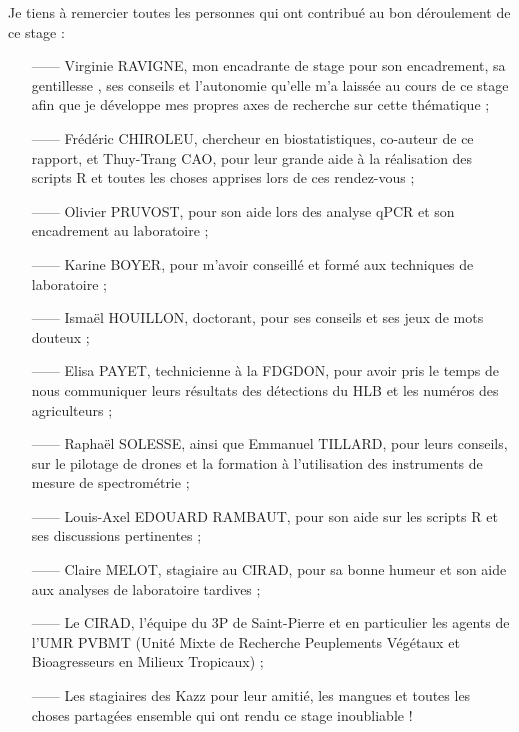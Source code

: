 \documentclass[
  11pt,
  french,
  a4paper,
  extrafontsizes,onecolumn,openright
  ]{memoir}
\begin{document}
\begin{small}

Je tiens à remercier toutes les personnes qui ont contribué au bon déroulement de ce stage : 
\begin{itemize}
\item[——] Virginie RAVIGNE, mon encadrante de stage pour son encadrement, sa gentillesse , ses conseils et l'autonomie qu'elle m'a laissée au cours de ce stage afin que je développe mes propres axes de recherche sur cette thématique ;

\item[——] Frédéric CHIROLEU, chercheur en biostatistiques, co-auteur de ce rapport, et Thuy-Trang CAO, pour leur grande aide à la réalisation des scripts R et toutes les choses apprises lors de ces rendez-vous ;

\item[——] Olivier PRUVOST,  pour son aide lors des analyse qPCR et son encadrement au laboratoire ;

\item[——] Karine BOYER, pour m’avoir conseillé et formé aux techniques de laboratoire ;

\item[——] Ismaël HOUILLON, doctorant, pour ses conseils et ses jeux de mots douteux ;

\item[——] Elisa PAYET, technicienne à la FDGDON, pour avoir pris le temps de nous communiquer leurs résultats des détections du HLB et les numéros des agriculteurs ;

\item[——] Raphaël SOLESSE, ainsi que Emmanuel TILLARD, pour leurs conseils, sur le pilotage de drones et la formation à l’utilisation des instruments de mesure de spectrométrie ;

\item[——] Louis-Axel EDOUARD RAMBAUT, pour son aide sur les scripts R et ses discussions pertinentes ;

\item[——] Claire MELOT, stagiaire au CIRAD, pour sa bonne humeur et son aide aux analyses de laboratoire tardives ;

\item[——] Le CIRAD, l’équipe du 3P de Saint-Pierre et en particulier les agents de l’UMR PVBMT (Unité Mixte de 
Recherche Peuplements Végétaux et Bioagresseurs en Milieux Tropicaux) ;

\item[——] Les stagiaires des Kazz pour leur amitié, les mangues et toutes les choses partagées ensemble qui ont rendu ce stage inoubliable !

\end{itemize}
\end{small}
\end{document}
